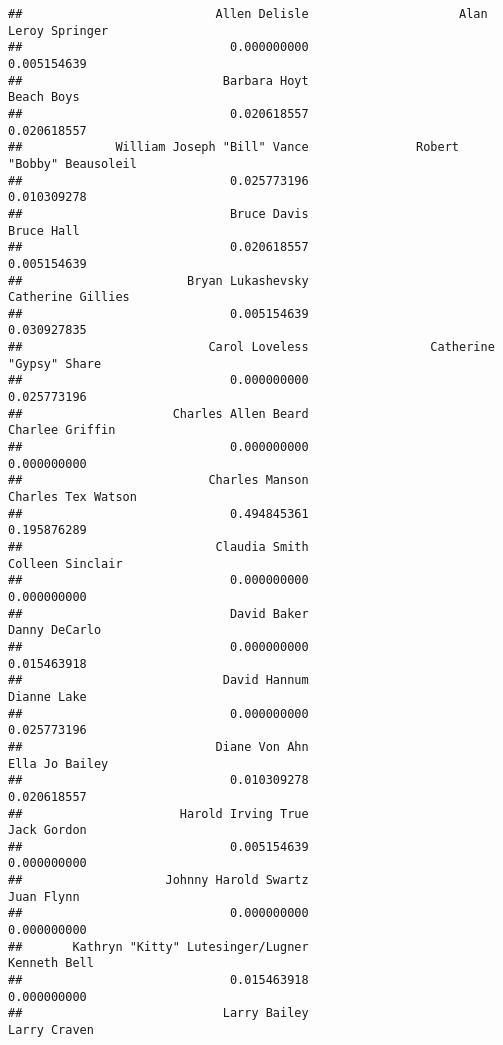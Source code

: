 \documentclass[
]{article}
\begin{document}
\begin{verbatim}
##                           Allen Delisle                     Alan Leroy Springer 
##                             0.000000000                             0.005154639 
##                            Barbara Hoyt                              Beach Boys 
##                             0.020618557                             0.020618557 
##             William Joseph "Bill" Vance               Robert "Bobby" Beausoleil 
##                             0.025773196                             0.010309278 
##                             Bruce Davis                              Bruce Hall 
##                             0.020618557                             0.005154639 
##                       Bryan Lukashevsky                       Catherine Gillies 
##                             0.005154639                             0.030927835 
##                          Carol Loveless                 Catherine "Gypsy" Share 
##                             0.000000000                             0.025773196 
##                     Charles Allen Beard                         Charlee Griffin 
##                             0.000000000                             0.000000000 
##                          Charles Manson                      Charles Tex Watson 
##                             0.494845361                             0.195876289 
##                           Claudia Smith                        Colleen Sinclair 
##                             0.000000000                             0.000000000 
##                             David Baker                           Danny DeCarlo 
##                             0.000000000                             0.015463918 
##                            David Hannum                             Dianne Lake 
##                             0.000000000                             0.025773196 
##                           Diane Von Ahn                          Ella Jo Bailey 
##                             0.010309278                             0.020618557 
##                      Harold Irving True                             Jack Gordon 
##                             0.005154639                             0.000000000 
##                    Johnny Harold Swartz                              Juan Flynn 
##                             0.000000000                             0.000000000 
##       Kathryn "Kitty" Lutesinger/Lugner                            Kenneth Bell 
##                             0.015463918                             0.000000000 
##                            Larry Bailey                            Larry Craven 

\end{verbatim}
\end{document}
